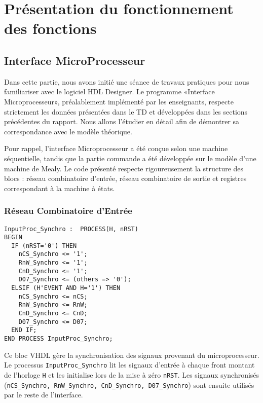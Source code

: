 \section{Présentation du fonctionnement des fonctions}

\subsection{Interface MicroProcesseur}

Dans cette partie, nous avons initié une séance de travaux pratiques pour nous familiariser avec le logiciel HDL Designer. Le programme «Interface Microprocesseur», préalablement implémenté par les enseignants, respecte strictement les données présentées dans le TD et développées dans les sections précédentes du rapport. Nous allons l’étudier en détail afin de démontrer sa correspondance avec le modèle théorique.
\newline

Pour rappel, l’interface Microprocesseur a été conçue selon une machine séquentielle, tandis que la partie commande a été développée sur le modèle d’une machine de Mealy. Le code présenté respecte rigoureusement la structure des blocs : réseau combinatoire d’entrée, réseau combinatoire de sortie et registres correspondant à la machine à états.
\newline

\subsubsection{Réseau Combinatoire d’Entrée}

\begin{lstlisting}[style=VHDLStyle, caption={Reseau Cominatoire d'entrée}]
InputProc_Synchro :  PROCESS(H, nRST)
BEGIN
  IF (nRST='0') THEN 
    nCS_Synchro <= '1';
    RnW_Synchro <= '1';
    CnD_Synchro <= '1';
    D07_Synchro <= (others => '0');
  ELSIF (H'EVENT AND H='1') THEN
    nCS_Synchro <= nCS;
    RnW_Synchro <= RnW;
    CnD_Synchro <= CnD;
    D07_Synchro <= D07;
  END IF;
END PROCESS InputProc_Synchro;
\end{lstlisting}

Ce bloc VHDL gère la synchronisation des signaux provenant du microprocesseur. Le processus \texttt{InputProc\_Synchro} lit les signaux d’entrée à chaque front montant de l’horloge \texttt{H} et les initialise lors de la mise à zéro \texttt{nRST}. Les signaux synchronisés (\texttt{nCS\_Synchro, RnW\_Synchro, CnD\_Synchro, D07\_Synchro}) sont ensuite utilisés par le reste de l’interface.

